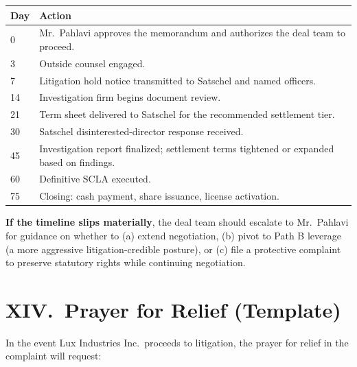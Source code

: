 \documentclass[11pt,letterpaper]{article}
\begin{document}
\begin{center}
\begin{tabular}{lp{10cm}}
\toprule
\textbf{Day} & \textbf{Action} \\
\midrule
0   & Mr.\ Pahlavi approves the memorandum and authorizes the deal team to proceed. \\
3   & Outside counsel engaged. \\
7   & Litigation hold notice transmitted to Satschel and named officers. \\
14  & Investigation firm begins document review. \\
21  & Term sheet delivered to Satschel for the recommended settlement tier. \\
30  & Satschel disinterested-director response received. \\
45  & Investigation report finalized; settlement terms tightened or expanded based on findings. \\
60  & Definitive SCLA executed. \\
75  & Closing: cash payment, share issuance, license activation. \\
\bottomrule
\end{tabular}
\end{center}

\textbf{If the timeline slips materially}, the deal team should
escalate to Mr.\ Pahlavi for guidance on whether to (a) extend
negotiation, (b) pivot to Path B leverage (a more aggressive
litigation-credible posture), or (c) file a protective complaint to
preserve statutory rights while continuing negotiation.

\section*{XIV.\ Prayer for Relief (Template)}

In the event Lux Industries Inc.\ proceeds to litigation, the prayer
for relief in the complaint will request:
\end{document}
